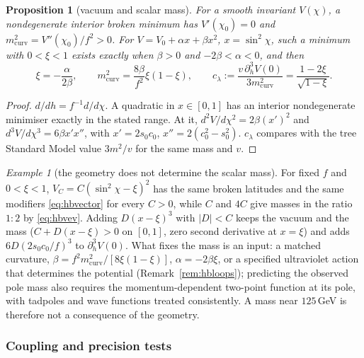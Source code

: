 \documentclass[aps,pra,onecolumn,superscriptaddress,nofootinbib,10pt]{revtex4-2}
\newtheorem{proposition}[theorem]{Proposition}
\theoremstyle{definition}
\theoremstyle{remark}
\newtheorem{example}[theorem]{Example}
\begin{document}
\begin{proposition}[vacuum and scalar mass]\label{prop:hbmass}
For a smooth invariant $V(\chi)$, a nondegenerate interior broken minimum has $V'(\chi_0)=0$ and $m_{\mathrm{curv}}^2=V''(\chi_0)/f^2>0$.  For
$V=V_0+\alpha x+\beta x^2$, $x=\sin^2\chi$, such a minimum with $0<\xi<1$ exists exactly when $\beta>0$ and $-2\beta<\alpha<0$, and then
\begin{equation}\label{eq:hbvev}
\xi=-\frac\alpha{2\beta},\qquad m_{\mathrm{curv}}^2=\frac{8\beta}{f^2}\xi(1-\xi),\qquad c_\lambda:=\frac{v\,\partial_h^3V(0)}{3m_{\mathrm{curv}}^2}=\frac{1-2\xi}{\sqrt{1-\xi}} .
\end{equation}
\end{proposition}
\begin{proof}
$d/dh=f^{-1}d/d\chi$.  A quadratic in $x\in[0,1]$ has an interior nondegenerate minimiser exactly in the stated range.  At it,
$d^2V/d\chi^2=2\beta(x')^2$ and $d^3V/d\chi^3=6\beta x'x''$, with $x'=2s_0c_0$, $x''=2(c_0^2-s_0^2)$.  $c_\lambda$ compares with the tree
Standard Model value $3m^2/v$ for the same mass and $v$.
\end{proof}

\begin{example}[the geometry does not determine the scalar mass]\label{ex:hbmasscounter}
For fixed $f$ and $0<\xi<1$, $V_C=C(\sin^2\chi-\xi)^2$ has the same broken latitudes and the same modifiers \eqref{eq:hbvector} for every
$C>0$, while $C$ and $4C$ give masses in the ratio $1:2$ by \eqref{eq:hbvev}.  Adding $D(x-\xi)^3$ with $\lvert D\rvert<C$ keeps the vacuum
and the mass ($C+D(x-\xi)>0$ on $[0,1]$, zero second derivative at $x=\xi$) and adds $6D(2s_0c_0/f)^3$ to $\partial_h^3V(0)$.  What fixes
the mass is an input: a matched curvature, $\beta=f^2m_{\mathrm{curv}}^2/[8\xi(1-\xi)]$, $\alpha=-2\beta\xi$, or a specified ultraviolet action
that determines the potential (Remark~\ref{rem:hbloops}); predicting the observed pole mass also requires the
momentum-dependent two-point function at its pole, with tadpoles and wave functions treated
consistently.  A mass near $125$\,GeV is therefore not a consequence of the geometry.
\end{example}

\subsubsection{Coupling and precision tests}
\end{document}
